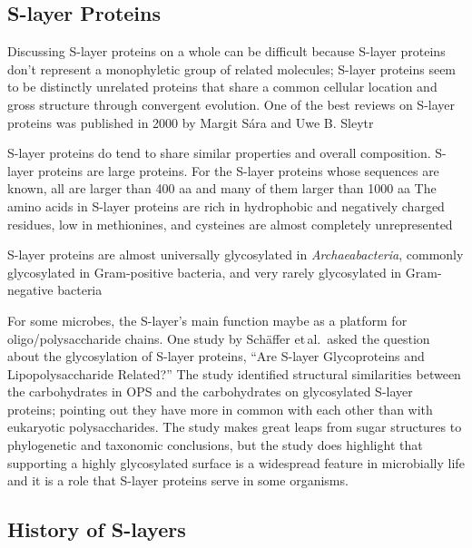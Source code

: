 \subsection{S-layer Proteins} \label{sub:intro-slayerproteins} %

Discussing \ac{S-layer} proteins on a whole can be difficult because \ac{S-layer} proteins don't represent a monophyletic group of related molecules; \ac{S-layer} proteins seem to be distinctly unrelated proteins that share a common cellular location and gross structure through convergent evolution. One of the best reviews on \ac{S-layer} proteins was published in 2000 by Margit S\'{a}ra and Uwe B. Sleytr 

\ac{S-layer} proteins do tend to share similar properties and overall composition. \ac{S-layer} proteins are large proteins. For the \ac{S-layer} proteins whose sequences are known, all are larger than 400 \ac{aa} and many of them larger than 1000 \ac{aa} The amino acids in \ac{S-layer} proteins are rich in hydrophobic and negatively charged residues, low in methionines, and  cysteines are almost completely unrepresented  

\ac{S-layer} proteins are almost universally glycosylated in \textit{Archaeabacteria}, commonly
glycosylated in Gram-positive bacteria, and very rarely glycosylated in Gram-negative
bacteria

For some microbes, the \ac{S-layer}'s main function maybe as a platform for oligo/polysaccharide chains. One study by Sch\"{a}ffer et\,al.~asked the question about the glycosylation of \ac{S-layer} proteins, ``Are \ac{S-layer} Glycoproteins and Lipopolysaccharide Related?'' The study identified structural similarities between the carbohydrates in \ac{OPS} and the carbohydrates on glycosylated \ac{S-layer} proteins; pointing out they have more in common with each other than with eukaryotic polysaccharides. The study makes great leaps from sugar structures to phylogenetic and taxonomic conclusions, but the study does highlight that supporting a highly glycosylated surface is a widespread feature in microbially life and it is a role that \ac{S-layer} proteins serve in some organisms.

\subsection{History of S-layers} %
\label{sub:history_of_s_layers}


